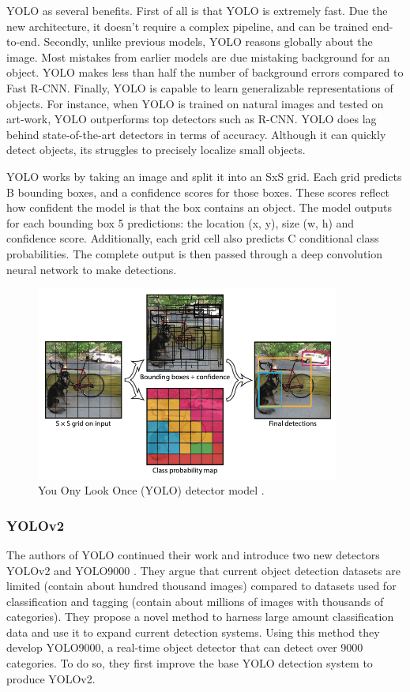 YOLO as several benefits. First of all is that YOLO is extremely fast. Due the new architecture, it doesn't require a complex pipeline, and can be trained end-to-end. Secondly, unlike previous models, YOLO reasons globally about the image. Most mistakes from earlier models are due mistaking background for an object. YOLO makes less than half the number of background errors compared to Fast R-CNN. Finally, YOLO is capable to learn generalizable representations of objects. For instance, when YOLO is trained on natural images and tested on art-work, YOLO outperforms top detectors such as R-CNN. YOLO does lag behind state-of-the-art detectors in terms of accuracy. Although it can quickly detect objects, its struggles to precisely localize small objects.

YOLO works by taking an image and split it into an SxS grid. Each grid predicts B bounding boxes, and a confidence scores for those boxes. These scores reflect how confident the model is that the box contains an object. The model outputs for each bounding box 5 predictions: the location (x, y), size (w, h) and confidence score. Additionally, each grid cell also predicts C conditional class probabilities. The complete output is then passed through a deep convolution neural network to make detections. 

\begin{figure}[ht]
\begin{center}
\includegraphics[width=10cm,keepaspectratio]{images/2_literature/yolo.png}
\end{center}
\caption{You Ony Look Once (YOLO) detector model \cite{Redmon2016}.}
\end{figure}


\subsubsection{YOLOv2}
The authors of YOLO continued their work and introduce two new detectors YOLOv2 and YOLO9000 \cite{Redmon2017}. They argue that current object detection datasets are limited (contain about hundred thousand images) compared to datasets used for classification and tagging (contain about millions of images with thousands of categories). They propose a novel method to harness large amount classification data and use it to expand current detection systems. Using this method they develop YOLO9000, a real-time object detector that can detect over 9000 categories. To do so, they first improve the base YOLO detection system to produce YOLOv2. 

